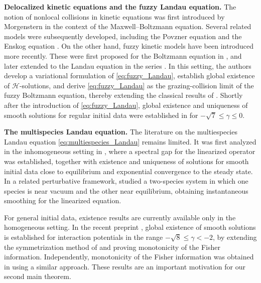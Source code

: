 \documentclass[10pt,oneside]{amsart}
\numberwithin{equation}{section}
\numberwithin{definition}{section}
\numberwithin{theorem}{section}
\numberwithin{lemma}{section}
\begin{document}
\textbf{Delocalized kinetic equations and the fuzzy Landau equation.} The notion of nonlocal collisions in kinetic equations was first introduced by Morgenstern \cite{Morgen1955MaxwellBoltzmann} in the context of the Maxwell--Boltzmann equation. Several related models were subsequently developed, including the Povzner equation \cite{povzner1962boltzmann} and the Enskog equation \cite{Arkeryd1986Enskog2D,Arkeryd1989Enskog,toscaniBellomo1987Enskog}. On the other hand, fuzzy kinetic models have been introduced more recently. These were first proposed for the Boltzmann equation in \cite{Erbar2025FuzzyBoltzmann,erbar2025LimitFuzzyBoltzmann}, and later extended to the Landau equation in the series \cite{duong2025FuzzyLandau1,duong2025FuzzyLandau2,duong2025FuzzyLandau3}. In this setting, the authors develop a variational formulation of \eqref{eq:fuzzy_Landau}, establish global existence of $\mathcal{H}$-solutions, and derive \eqref{eq:fuzzy_Landau} as the grazing-collision limit of the fuzzy Boltzmann equation, thereby extending the classical results of \cite{AlexVillani2004LandauApproxi}. Shortly after the introduction of \cref{eq:fuzzy_Landau}, global existence and uniqueness of smooth solutions for regular initial data were established in \cite{gualdani2025FuzzyLandauFisher} for $-\sqrt 7 \leq \gamma \leq 0$.


\textbf{The multispecies Landau equation.}
The literature on the multiespecies Landau equation \eqref{eq:multiespecies_Landau} remains limited. It was first analyzed in the inhomogeneous setting in \cite{GualdaniZamponi2017MultiespLandau}, where a spectral gap for the linearized operator was established, together with existence and uniqueness of solutions for smooth initial data close to equilibrium and exponential convergence to the steady state. In a related perturbative framework, \cite{YuHaitaoKung2018LinearMultiLandau} studied a two-species system in which one species is near vacuum and the other near equilibrium, obtaining instantaneous smoothing for the linearized equation.

For general initial data, existence results are currently available only in the homogeneous setting. In the recent preprint \cite{JunnWinterYoldas2025multiLandau}, global existence of smooth solutions is established for interaction potentials in the range $-\sqrt{8}\leq \gamma<-2$, by extending the symmetrization method of \cite{GS24} and proving monotonicity of the Fisher information. Independently, monotonicity of the Fisher information was obtained in \cite{zhu2025fisherinformationmultispecieslandau} using a similar approach. These results are an important motivation for our second main theorem.
\end{document}

